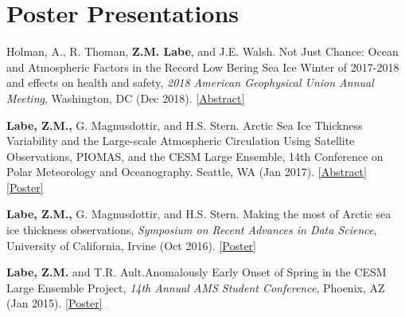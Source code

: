 \documentclass[margin,line,palatino,courier,10pt]{res}
\begin{document}
\begin{resume}
\begin{etaremune}[leftmargin=0in,topsep=0in,parsep=0in]
\end{etaremune}

\section{\sc \textcolor{Cerulean}{\large{\textbf{Poster Presentations}}}}
\begin{etaremune}[leftmargin=0in,topsep=0in,parsep=0in]
\item Holman, A., R. Thoman, \textbf{Z.M. Labe}, and J.E. Walsh. Not Just Chance: Ocean and Atmospheric Factors in the Record Low Bering Sea Ice Winter of 2017-2018 and effects on health and safety, \textit{2018 American Geophysical Union Annual Meeting}, Washington, DC (Dec 2018). \href{https://agu.confex.com/agu/fm18/meetingapp.cgi/Paper/451295}{[Abstract]}
\item \textbf{Labe, Z.M.,} G. Magnusdottir, and H.S. Stern. Arctic Sea Ice Thickness Variability and the Large-scale Atmospheric Circulation Using Satellite Observations, PIOMAS, and the CESM Large Ensemble, 14th Conference on Polar Meteorology and Oceanography. Seattle, WA (Jan 2017). \href{https://ams.confex.com/ams/97Annual/webprogram/Paper313445.html}{[Abstract]} \href{http://sites.uci.edu/zlabe/files/2017/01/ZLabeMagnusdottirStern_AMSposter_2017.pdf}{[Poster]}
\item \textbf{Labe, Z.M.,} G. Magnusdottir, and H.S. Stern. Making the most of Arctic sea ice thickness observations, \textit{Symposium on Recent Advances in Data Science}, University of California, Irvine (Oct 2016). \href{http://sites.uci.edu/zlabe/files/2016/10/ZLabeMagnusdottirStern_DSIposter_Oct16.pdf}{[Poster]}
\item \textbf{Labe, Z.M.} and T.R. Ault.\@ Anomalously Early Onset of Spring in the CESM Large Ensemble Project, \textit{14th Annual AMS Student Conference}, Phoenix, AZ (Jan 2015). \href{https://ams.confex.com/ams/95Annual/webprogram/Paper271063.html}{[Poster]} 

\end{etaremune}

\vspace{-0.1in}
\noindent\textcolor{Cerulean}{\makebox[\linewidth][r]{\rule{\textwidth}{5pt}}}
\vspace{-0.3in}


\end{resume}
\end{document}
